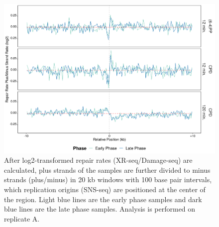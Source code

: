 \begin{figure}[H]
    \begin{center}
    \includegraphics[width=\textwidth]{Chapters/7_appendix/figures/supfig60}
    \caption[Repair rate plus/minus ratio of replication origins in 20 kb (replicate A).]{After log2-transformed repair rates (XR-seq/Damage-seq) are calculated, plus strands of the samples are further divided to minus strands (plus/minus) in 20 kb windows with 100 base pair intervals, which replication origins (SNS-seq) are positioned at the center of the region. Light blue lines are the early phase samples and dark blue lines are the late phase samples. Analysis is performed on replicate A.}
    \label{supfig:rrpm20snsA}
    \end{center}
    \end{figure}

